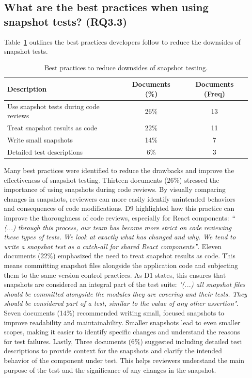 \documentclass[
	msc, %
	english %
]{../ppgccufmg}
\begin{document}
        \subsection{What are the best practices when using snapshot tests? (RQ3.3)}
        Table~\ref{tab:best_practices_snapshot_testing} outlines the best practices developers follow to reduce the downsides of snapshot tests.

        \hspace{1pt}
        \begin{table}[!ht]
        \centering
        \begin{tabular}{p{7cm}cc}
            \toprule
            \textbf{Description} & \textbf{Documents (\%)} & \textbf{Documents (Freq)} \\
            \midrule
            Use snapshot tests during code reviews & 26\% & 13 \\
            Treat snapshot results as code         & 22\% & 11 \\
            Write small snapshots                  & 14\% & 7  \\
            Detailed test descriptions             & 6\%  & 3  \\
            \bottomrule
        \end{tabular}
        \caption{Best practices to reduce downsides of snapshot testing.}
        \label{tab:best_practices_snapshot_testing}
        \end{table}
        
        Many best practices were identified to reduce the drawbacks and improve the effectiveness of snapshot testing. Thirteen documents (26\%) stressed the importance of using snapshots during code reviews. By visually comparing changes in snapshots, reviewers can more easily identify unintended behaviors and consequences of code modifications. D9 highlighted how this practice can improve the thoroughness of code reviews, especially for React components: \textit{“ (...) through this process, our team has become more strict on code reviewing these types of tests. We look at exactly what has changed and why. We tend to write a snapshot test as a catch-all for shared React components”}. Eleven documents (22\%) emphasized the need to treat snapshot results as code. This means committing snapshot files alongside the application code and subjecting them to the same version control practices. As D1 states, this ensures that snapshots are considered an integral part of the test suite: \textit{"(...) all snapshot files should be committed alongside the modules they are covering and their tests. They should be considered part of a test, similar to the value of any other assertion"}. Seven documents (14\%) recommended writing small, focused snapshots to improve readability and maintainability. Smaller snapshots lead to even smaller scopes, making it easier to identify specific changes and understand the reasons for test failures. Lastly, Three documents (6\%) suggested including detailed test descriptions to provide context for the snapshots and clarify the intended behavior of the component under test. This helps reviewers understand the main purpose of the test and the significance of any changes in the snapshot.
\end{document}
